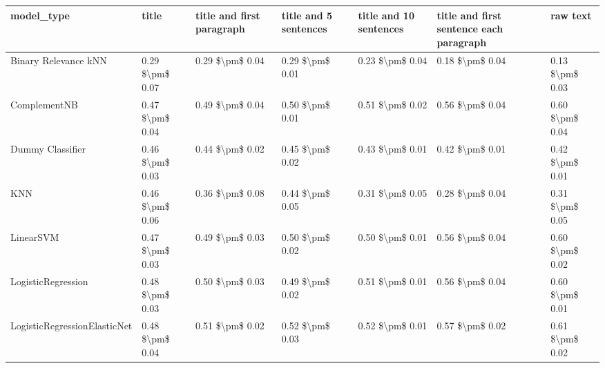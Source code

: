 \begin{tabular}{lllllll}
\toprule
                     model\_type &           title & title and first paragraph & title and 5 sentences & title and 10 sentences & title and first sentence each paragraph &            raw text \\
\midrule
           Binary Relevance kNN & 0.29 \$\textbackslash pm\$ 0.07 &           0.29 \$\textbackslash pm\$ 0.04 &       0.29 \$\textbackslash pm\$ 0.01 &        0.23 \$\textbackslash pm\$ 0.04 &                         0.18 \$\textbackslash pm\$ 0.04 &     0.13 \$\textbackslash pm\$ 0.03 \\
                   ComplementNB & 0.47 \$\textbackslash pm\$ 0.04 &           0.49 \$\textbackslash pm\$ 0.04 &       0.50 \$\textbackslash pm\$ 0.01 &        0.51 \$\textbackslash pm\$ 0.02 &                         0.56 \$\textbackslash pm\$ 0.04 &     0.60 \$\textbackslash pm\$ 0.04 \\
               Dummy Classifier & 0.46 \$\textbackslash pm\$ 0.03 &           0.44 \$\textbackslash pm\$ 0.02 &       0.45 \$\textbackslash pm\$ 0.02 &        0.43 \$\textbackslash pm\$ 0.01 &                         0.42 \$\textbackslash pm\$ 0.01 &     0.42 \$\textbackslash pm\$ 0.01 \\
                            KNN & 0.46 \$\textbackslash pm\$ 0.06 &           0.36 \$\textbackslash pm\$ 0.08 &       0.44 \$\textbackslash pm\$ 0.05 &        0.31 \$\textbackslash pm\$ 0.05 &                         0.28 \$\textbackslash pm\$ 0.04 &     0.31 \$\textbackslash pm\$ 0.05 \\
                      LinearSVM & 0.47 \$\textbackslash pm\$ 0.03 &           0.49 \$\textbackslash pm\$ 0.03 &       0.50 \$\textbackslash pm\$ 0.02 &        0.50 \$\textbackslash pm\$ 0.01 &                         0.56 \$\textbackslash pm\$ 0.04 &     0.60 \$\textbackslash pm\$ 0.02 \\
             LogisticRegression & 0.48 \$\textbackslash pm\$ 0.03 &           0.50 \$\textbackslash pm\$ 0.03 &       0.49 \$\textbackslash pm\$ 0.02 &        0.51 \$\textbackslash pm\$ 0.01 &                         0.56 \$\textbackslash pm\$ 0.04 &     0.60 \$\textbackslash pm\$ 0.01 \\
   LogisticRegressionElasticNet & 0.48 \$\textbackslash pm\$ 0.04 &           0.51 \$\textbackslash pm\$ 0.02 &       0.52 \$\textbackslash pm\$ 0.03 &        0.52 \$\textbackslash pm\$ 0.01 &                         0.57 \$\textbackslash pm\$ 0.02 &     0.61 \$\textbackslash pm\$ 0.02 \\

\end{tabular}
